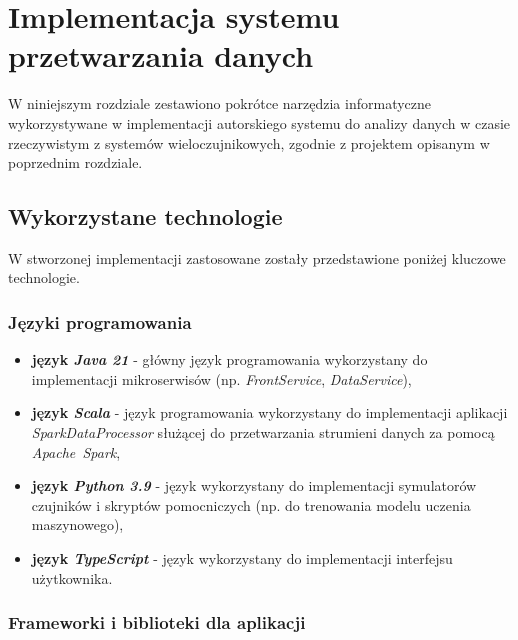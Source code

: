 \section{Implementacja systemu przetwarzania danych}
\label{sec:implementacja_systemu}

W niniejszym rozdziale zestawiono pokrótce narzędzia informatyczne wykorzystywane w implementacji autorskiego systemu do analizy danych w czasie rzeczywistym z systemów wieloczujnikowych,
zgodnie z projektem opisanym w poprzednim rozdziale.

\subsection{Wykorzystane technologie}
\label{subsec:technologie}

W stworzonej implementacji zastosowane zostały przedstawione poniżej kluczowe technologie.

\subsubsection{Języki programowania}
\label{subsubsec:jezyki_programowania}

\begin{itemize}
    \item \textbf{język \textit{Java 21}} - główny język programowania wykorzystany do implementacji mikroserwisów (np. \textit{FrontService}, \textit{DataService}),
    \item \textbf{język \textit{Scala}} - język programowania wykorzystany do implementacji aplikacji \textit{SparkDataProcessor} służącej do przetwarzania strumieni danych za pomocą \mbox{\textit{Apache Spark}},
    \item \textbf{język \textit{Python 3.9}} - język wykorzystany do implementacji symulatorów czujników i skryptów pomocniczych (np. do trenowania modelu uczenia maszynowego),
    \item \textbf{język \textit{TypeScript}} - język wykorzystany do implementacji interfejsu użytkownika.
\end{itemize}

\subsubsection{Frameworki i biblioteki dla aplikacji}
\label{subsubsec:frameworki}

